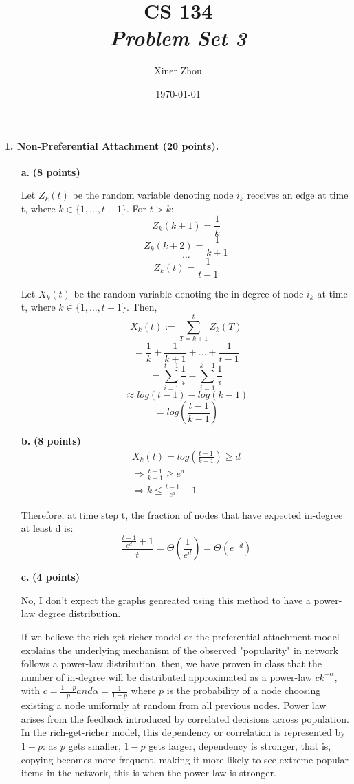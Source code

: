 \documentclass[11pt]{article} %
\title{CS 134 \\ \emph{Problem Set 3}}
\author{Xiner Zhou}
\date{\today} %
\begin{document}
 
\maketitle

  
\paragraph{1. Non-Preferential Attachment (20 points).} 

\begin{itemize}
	\item[\textbf{a.}] \textbf{(8 points)}  

Let $Z_k(t)$  be the random variable denoting node $i_k$ receives an edge at time t, where $k \in \{1, \dots, t-1\}$.  For $t>k$:
$$Z_k(k+1)=\frac{1}{k}$$
$$Z_k(k+2)=\frac{1}{k+1}$$
$$ \dots $$
$$Z_k(t)=\frac{1}{t-1}$$

Let $X_k(t)$  be the random variable denoting the in-degree of node $i_k$ at time t, where $k \in \{1, \dots, t-1\}$. Then, 
$$X_k(t):=\sum_{T=k+1}^t Z_k(T)$$
$$=\frac{1}{k}+\frac{1}{k+1}+\dots+\frac{1}{t-1}$$
$$=\sum_{i=1}^{t-1} \frac{1}{i} - \sum_{i=1}^{k-1} \frac{1}{i}$$
$$\approx log(t-1) - log(k-1) $$
$$=log(\frac{t-1}{k-1})$$

	
	
	\item[\textbf{b.}] \textbf{(8 points)} 
\begin{eqnarray}
X_k(t)= log (\frac{t-1}{k-1}) \geq d \\
\Rightarrow \frac{t-1}{k-1}  \geq e^d \\
\Rightarrow k  \leq \frac{t-1}{e^d}+1
\end{eqnarray}

Therefore, at time step t, the fraction of nodes that have expected in-degree at least d is: 
$$ \frac{\frac{t-1}{e^d}+1}{t}=\Theta(\frac{1}{e^d})=\Theta(e^{-d})$$ 

	\item[\textbf{c.}] \textbf{(4 points)}

No, I don't expect the graphs genreated using this method to have a power-law degree distribution. 

If we believe the rich-get-richer model or the preferential-attachment model explains the underlying mechanism of the observed "popularity" in network follows a power-law distribution, 	then, we have proven in class that the number of in-degree will be distributed approximated as a power-law $c k^{-\alpha}$, with $c = \frac{1-p}{p} and \alpha = \frac{1}{1-p}$ where $p$ is the probability of a node choosing existing a node uniformly at random from all previous nodes. Power law arises from the feedback introduced by correlated decisions across population. In the rich-get-richer model, this dependency or correlation is represented by $1-p$: as $p$ gets smaller, $1-p$ gets larger, dependency is stronger, that is, copying becomes more frequent, making it more likely to see extreme popular items in the network, this is when the power law is stronger.
 

\end{itemize}
\end{document}
